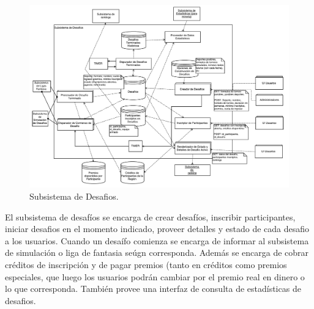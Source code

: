 \begin{figure}[H]
  \includegraphics[width=1.1\textwidth, page=1, clip, trim=10 0 10 0]{imagenes/Subs-desafios.pdf}
  \caption{Subsistema de Desafios.}
\end{figure}
El subsistema de desafíos se encarga de crear desafíos, inscribir participantes, iniciar desafios en el momento indicado, proveer detalles y estado de cada desafio a los usuarios.
Cuando un desaífo comienza se encarga de informar al subsistema de simulación o liga de fantasia seúgn corresponda. Además se encarga de cobrar créditos de inscripción y de pagar premios (tanto en créditos como premios especiales, que luego los usuarios podrán cambiar por el premio real en dinero o lo que corresponda. También provee una interfaz de consulta de estadísticas de desafios.\\

